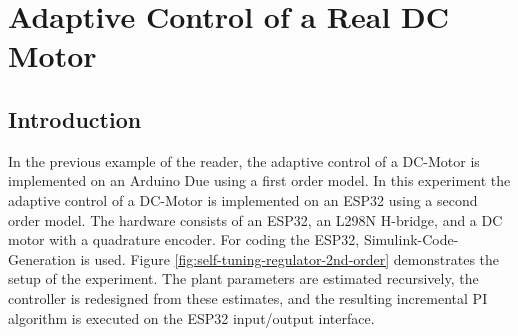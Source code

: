 \chapter{Adaptive Control of a Real DC Motor}
\section{Introduction}
In the previous example of the reader, the adaptive control of a DC-Motor is implemented on an Arduino Due using a first order model.
In this experiment the adaptive control of a DC-Motor is implemented on an ESP32 using a second order model. The hardware consists of an ESP32, an L298N H-bridge, and a DC motor with a quadrature encoder. For coding the ESP32, Simulink-Code-Generation is used. Figure \ref{fig:self-tuning-regulator-2nd-order} demonstrates the setup of the experiment. The plant parameters are estimated recursively, the controller is redesigned from these estimates, and the resulting incremental PI algorithm is executed on the ESP32 input/output interface.

